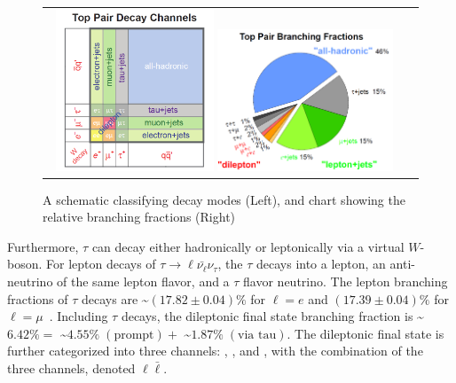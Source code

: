 \begin{refsection}
\begin{figure}[htb]
\begin{center}
    \begin{tabular}{cc}
        \includegraphics[width=0.45\textwidth]{fig_TopQuark/Top_Pair_Decay_Channels.png}
        \includegraphics[width=0.50\textwidth]{fig_TopQuark/Top_Pair_Branching_Fractions.png}
    \end{tabular}
    \caption{A schematic classifying \ttbar decay modes (Left), and chart showing the relative branching fractions (Right)~\cite{d0_diagrams}
            }
    \label{Top_Pair_Decay_Channels}
  \end{center}
\end{figure}

Furthermore, $\tau$ can decay either hadronically or leptonically via a virtual $W$-boson.
For lepton decays of $\tau \rightarrow \ell \bar{\nu_\ell} \nu_\tau$, the $\tau$ decays into a lepton, an anti-neutrino of the same lepton flavor, and a $\tau$ flavor neutrino.
The lepton branching fractions of $\tau$ decays are \sim$(17.82 \pm 0.04 ) \%$ for $\ell = e$ and $(17.39 \pm 0.04) \%$ for $\ell = \mu$~\cite{bib:PDG}.
Including $\tau$ decays, the \ttbar dileptonic final state branching fraction is \sim$6.42 \% = $ \sim$4.55 \% \; (\text{prompt}) + $ \sim$1.87 \% \; (\text{via tau})$.
The \ttbar dileptonic final state is further categorized into three channels: \ee, \emu, and \mumu, with the combination of the three channels, denoted $\ell \bar{\ell}$.


\end{refsection}
